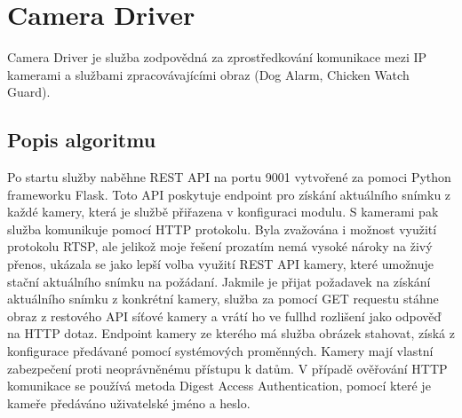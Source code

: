 \section{Camera Driver}\label{sec:camera-driver}
Camera Driver je služba zodpovědná za zprostředkování komunikace mezi IP kamerami a službami zpracovávajícími obraz (Dog Alarm, Chicken Watch Guard).\newline

\subsection*{Popis algoritmu}
Po startu služby naběhne REST API na portu 9001 vytvořené za pomoci Python frameworku Flask.
Toto API poskytuje endpoint pro získání aktuálního snímku z každé kamery, která je službě přiřazena v konfiguraci modulu.
S kamerami pak služba komunikuje pomocí HTTP protokolu.
Byla zvažována i možnost využití protokolu RTSP, ale jelikož moje řešení prozatím nemá vysoké nároky na živý přenos, ukázala se jako lepší volba využití REST API kamery, které umožnuje stační aktuálního snímku na požádaní.
Jakmile je přijat požadavek na získání aktuálního snímku z konkrétní kamery, služba za pomocí GET requestu stáhne obraz z restového API síťové kamery a vrátí ho ve \gls{fullhd} rozlišení jako odpověď na HTTP dotaz.
Endpoint kamery ze kterého má služba obrázek stahovat, získá z konfigurace předávané pomocí systémových proměnných.
Kamery mají vlastní zabezpečení proti neoprávněnému přístupu k datům.
V případě ověřování HTTP komunikace se používá metoda Digest Access Authentication, pomocí které je kameře předáváno uživatelské jméno a heslo.


%
%
%
%
